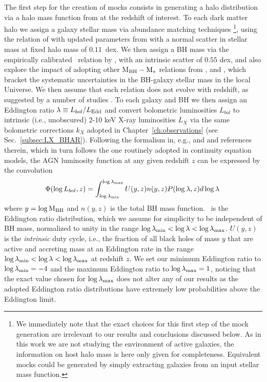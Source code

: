The first step for the creation of mocks consists in generating a halo distribution via a halo mass function from \citet{2008ApJ...688..709T} at the redshift of interest. To each dark matter halo we assign a galaxy stellar mass via abundance matching techniques \footnote{We immediately note that the exact choices for this first step of the mock generation are irrelevant to our results and conclusions discussed below. As in this work we are not studying the environment of active galaxies, the information on host halo mass is here only given for completeness. Equivalent mocks could be generated by simply extracting galaxies from an input stellar mass function.}, using the relation of \citet[][]{moster10} with updated parameters from \citet[][Eq.~5]{2019MNRAS.483.2506G} with a normal scatter in stellar mass at fixed halo mass of $0.11$~dex.
We then assign a BH mass via the empirically calibrated \MBHMS\ relation by \citet{2015ApJ...813...82R}, with an intrinsic scatter of $0.55$ dex, and also explore the impact of adopting other M$_{\rm BH}-{\rm M}_*$ relations from \citet{2016MNRAS.460.3119S}, \citet{2018ApJ...869..113D} and \citet{2019ApJ...876..155S}, which bracket the systematic uncertainties in the BH-galaxy stellar mass in the local Universe. 
We then assume that each relation does not evolve with redshift, as suggested by a number of studies \citep[e.g.][and Fig.~\ref{fig:comp_models}]{shankar09c,2019ApJ...885L..36D, 2020ApJ...889...32S, 2020MNRAS.493.1500S}.
To each galaxy and BH we then assign an Eddington ratio $\lambda\equiv L_{bol}/L_{\rm Edd}$ and convert bolometric luminosities $L_{bol}$ to intrinsic (i.e., unobscured) 2-10 keV X-ray luminosities $L_X$ via the same bolometric corrections $k_X$ adopted in Chapter~\ref{ch:observations} (see Sec.~\ref{subsec:LX_BHAR}). Following the formalism in, e.g., \citet{Shankar13Acc} and \citet{Allevato21} and references therein, which in turn follows the one routinely adopted in continuity equation models, the AGN luminosity function at any given redshift $z$ can be expressed by the convolution
\begin{equation}
\Phi(\log L_{bol},z)=\int_{\log \lambda_{\rm min}}^{\log \lambda_{\rm max}}U(y,z) n(y,z) P(\log \lambda,z)d\log \lambda \, 
\label{eq:PhiL}
\end{equation}
where $y=\log {\rm M}_{\rm BH}$ and $n(y,z)$ is the total BH mass function. \PLz\ is the
Eddington ratio distribution, which we assume for simplicity to be independent of BH mass,
normalized to unity in the range $\log \lambda_{\rm min}<\log \lambda<\log \lambda_{\rm max}$.
$U(y,z)$ is the \emph{intrinsic} duty cycle, i.e., the fraction of all black holes of mass $y$
that are active and accreting mass at an Eddington rate in the range
$\log \lambda_{\rm min}<\log \lambda<\log \lambda_{\rm max}$ at redshift $z$.
We set our minimum Eddington ratio to $\log \lambda_{\rm min}=-4$ and the maximum
Eddington ratio to $\log \lambda_{\rm max}=1$, noticing that the exact value chosen for
$\log \lambda_{\rm max}$ does not alter any of our results as the adopted Eddington ratio
distributions have extremely low probabilities above the Eddington limit.

